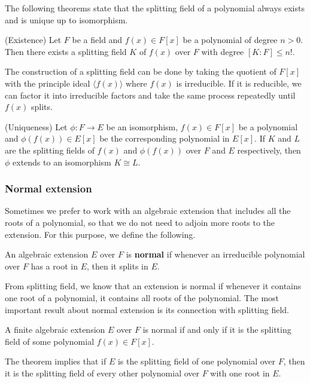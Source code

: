 \documentclass[../main.tex]{subfiles}
\begin{document}
The following theorems state that the splitting field of a polynomial always exists and is unique up to isomorphism. 

\reversemarginpar
{}
\begin{theorem}(Existence)
Let $F$ be a field and $f(x) \in F[x]$ be a polynomial of degree $n > 0$. Then there exists a splitting field $K$ of $f(x)$ over $F$ with degree $[K:F] \le n!$. 
\end{theorem}
The construction of a splitting field can be done by taking the quotient of $F[x]$ with the principle ideal $\langle f(x)\rangle$ where $f(x)$ is irreducible. If it is reducible, we can factor it into irreducible factors and take the same process repeatedly until $f(x)$ splits. %

\reversemarginpar
{}
\begin{theorem}(Uniqueness)
Let $\phi:F \rightarrow E$ be an isomorphism, $f(x) \in F[x]$ be a polynomial and $\phi(f(x)) \in E[x]$ be the corresponding polynomial in $E[x]$. If $K$ and $L$ are the splitting fields of $f(x)$ and $\phi(f(x))$ over $F$ and $E$ respectively, then $\phi$ extends to an isomorphism $K \cong L$.
\end{theorem}


\subsubsection{Normal extension}

Sometimes we prefer to work with an algebraic extension that includes all the roots of a polynomial, so that we do not need to adjoin more roots to the extension. For this purpose, we define the following. 


\reversemarginpar
{}
\begin{definition}
An algebraic extension $E$ over $F$ is \textbf{normal} if whenever an irreducible polynomial over $F$ has a root in $E$, then it splits in $E$. 
\end{definition}
From splitting field, we know that an extension is normal if whenever it contains one root of a polynomial, it contains all roots of the polynomial. 
The most important result about normal extension is its connection with splitting field.

\reversemarginpar
{}
\begin{theorem}
\label{theorem:normal iff splitting}
A finite algebraic extension $E$ over $F$ is normal if and only if it is the splitting field of some polynomial $f(x) \in F[x]$.
\end{theorem}
The theorem implies that if $E$ is the splitting field of one polynomial over $F$, then it is the splitting field of every other polynomial over $F$ with one root in $E$. %
\end{document}
